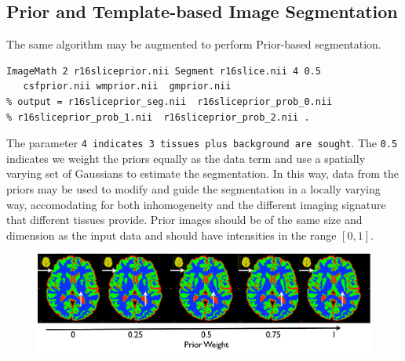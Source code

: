 \documentclass{InsightArticle}
\begin{document}
\subsection{Prior and Template-based Image Segmentation}
The same algorithm may be augmented 
to perform Prior-based segmentation.  
\begin{verbatim}
ImageMath 2 r16sliceprior.nii Segment r16slice.nii 4 0.5 
   csfprior.nii wmprior.nii  gmprior.nii 
% output = r16sliceprior_seg.nii  r16sliceprior_prob_0.nii  
% r16sliceprior_prob_1.nii  r16sliceprior_prob_2.nii .  
\end{verbatim}
The parameter \texttt{4 indicates 3 tissues plus background are sought}.  The \texttt{0.5} indicates 
we weight the priors equally as the data term and use a spatially varying set of Gaussians 
to estimate the segmentation.  In this way, data from the priors may be used to modify 
and guide the segmentation in a locally varying way, accomodating for both inhomogeneity 
and the different imaging signature that different tissues provide.   Prior images should be 
of the same size and dimension as the input data and should have intensities in the range $[0,1]$.
\begin{figure}
\includegraphics[width=1\textwidth]{Figures/segmentation2.pdf}
\label{fig:seg2}
\end{figure}
\end{document}

